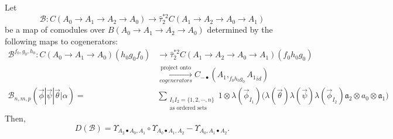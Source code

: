 %
\begin{prop} \label{prop:c4}
Let 
$$
\mathcal{B}: C(A_0 \to A_1 \to A_2 \to A_0)
\to \hat{\tau}_2^{*2}C(A_1 \to A_2 \to A_0 \to A_1)
$$ 
be a map of comodules over 
$B(A_0 \to A_1 \to A_2 \to A_0)$ 
determined by the following maps to 
cogenerators:
\begin{align*}
\mathcal{B}^{f_0, g_0,h_0}: 
  C(A_0 \to A_1 \to A_0)(h_0g_0f_0) 
&\to
\hat{\tau}_2^{*2}C(A_1 \to A_2 \to A_0 \to A_1)
  (f_0h_0g_0)\\
&\xrightarrow[cogenerators]{\textrm{project onto}}
C_{-\bullet}(A_1, _{f_0h_0g_0}{A_1}_{id})\\
\mathcal{B}_{n, m, p} (\vec{\phi} | \vec{\psi} | \vec{\theta} | \alpha) 
= & \sum_{\substack{I_1I_2 = \{1,2,\cdots,n\} \\
                          \textrm{as ordered sets}}}
  1 \otimes \lambda(\vec{\phi}_{I_1})\big( \lambda(\vec{\theta}) \lambda(\vec{\psi}) \lambda(\vec{\phi}_{I_2})
  \mathfrak{a}_2 \otimes a_0 \otimes \mathfrak{a}_1 \big)               
\end{align*}
Then, 
\begin{equation} \label{eq:prop4}
D(\mathcal{B}) = 
  \Upsilon_{A_2\bullet A_0, A_1} \circ
  \Upsilon_{A_0\bullet A_1, A_2} 
   - \Upsilon_{A_0, A_1\bullet A_2}.
\end{equation}
\end{prop}

